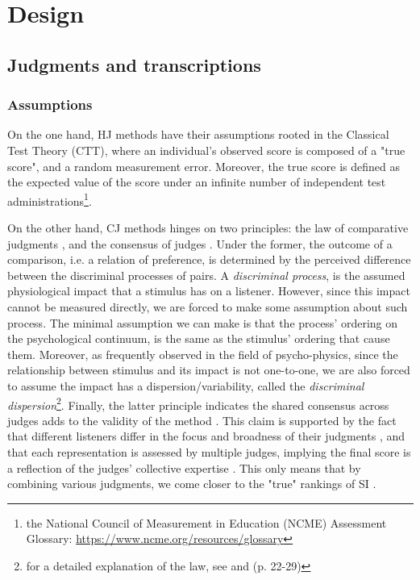 \section{Design}
%
\subsection{Judgments and transcriptions}
%
\subsubsection{Assumptions}
%
On the one hand, HJ methods have their assumptions rooted in the Classical Test Theory (CTT), where an individual's observed score is composed of a "true score", and a random measurement error. Moreover, the true score is defined as the expected value of the score under an infinite number of independent test administrations\footnote{the National Council of Measurement in Education (NCME) Assessment Glossary: \url{ https://www.ncme.org/resources/glossary}}.

On the other hand, CJ methods hinges on two principles: the law of comparative judgments \citep{Thurstone_1927}, and the consensus of judges \citep{Lesterhuis_2018}. Under the former, the outcome of a comparison, i.e. a relation of preference, is determined by the perceived difference between the discriminal processes of pairs. A \textit{discriminal process}, is the assumed physiological impact that a stimulus has on a listener. However, since this impact cannot be measured directly, we are forced to make some assumption about such process. The minimal assumption we can make is that the process' ordering on the psychological continuum, is the same as the stimulus' ordering that cause them. Moreover, as frequently observed in the field of psycho-physics, since the relationship between stimulus and its impact is not one-to-one, we are also forced to assume the impact has a dispersion/variability, called the \textit{discriminal dispersion}\footnote{for a detailed explanation of the law, see \citet{Thurstone_1927} and \citet{Verhavert_2018} (p. 22-29)}. Finally, the latter principle indicates the shared consensus across judges adds to the validity of the method \citep{Lesterhuis_2018}. This claim is supported by the fact that different listeners differ in the focus and broadness of their judgments \citep{Lesterhuis_2018}, and that each representation is assessed by multiple judges, implying the final score is a reflection of the judges’ collective expertise \citep{Pollitt_2012b}. This only means that by combining various judgments, we come closer to the "true" rankings of SI \citep{Lee_et_al_2014}.
%
%
